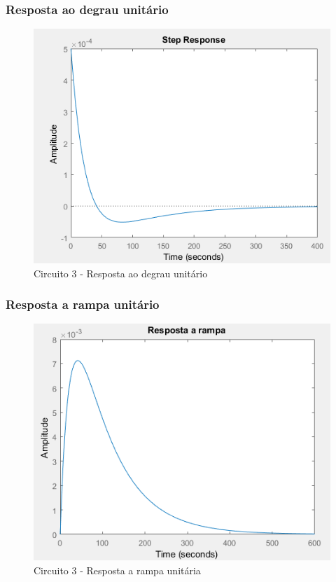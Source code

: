 \documentclass[a4paper, 12pt]{article}
\begin{document}
			\subsubsection{Resposta ao degrau unitário}
			\begin{figure}[!ht]
				\centering
				\includegraphics[scale=0.71]{img/1g_circ3.png}
				\caption{Circuito 3 - Resposta ao degrau unitário}
			\end{figure}
			\subsubsection{Resposta a rampa unitário}
			\begin{figure}[!ht]
				\centering
				\includegraphics[scale=0.72]{img/1h_circ3.png}
				\caption{Circuito 3 - Resposta a rampa unitária}
			\end{figure}
\end{document}
